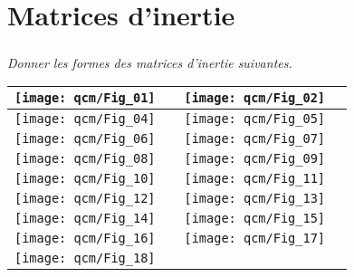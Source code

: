 \newpage

\section*{Matrices d'inertie}
\subparagraph*{}\textit{Donner les formes des matrices d'inertie suivantes.}

\begin{center}
\begin{tabular}{|c|p{2cm}||c|p{2cm}|}
\hline 
\texttt{[image: qcm/Fig\_01]} & & \texttt{[image: qcm/Fig\_02]} & \\ \hline
\texttt{[image: qcm/Fig\_04]} & & \texttt{[image: qcm/Fig\_05]} & \\ \hline
\texttt{[image: qcm/Fig\_06]} & & \texttt{[image: qcm/Fig\_07]} & \\ \hline
\texttt{[image: qcm/Fig\_08]} & & \texttt{[image: qcm/Fig\_09]} & \\ \hline
\texttt{[image: qcm/Fig\_10]} & & \texttt{[image: qcm/Fig\_11]} & \\ \hline
\texttt{[image: qcm/Fig\_12]} & & \texttt{[image: qcm/Fig\_13]} & \\ \hline
\texttt{[image: qcm/Fig\_14]} & & \texttt{[image: qcm/Fig\_15]} & \\ \hline
\texttt{[image: qcm/Fig\_16]} & & \texttt{[image: qcm/Fig\_17]} & \\ \hline\texttt{[image: qcm/Fig\_18]} & &  & \\ \hline
\end{tabular}
\end{center}

